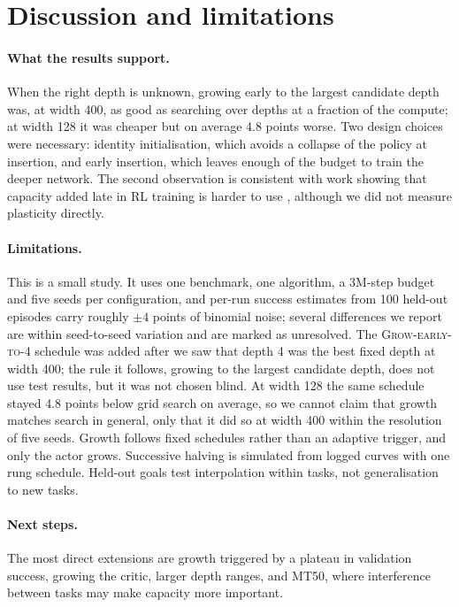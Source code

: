 \documentclass{article}
\newcommand{\growF}{\textsc{Grow-early-to-4}}
\begin{document}
\FloatBarrier
\section{Discussion and limitations}

\paragraph{What the results support.}
When the right depth is unknown, growing early to the largest candidate depth was, at width 400, as good as searching over depths at a fraction of the compute; at width 128 it was cheaper but on average 4.8 points worse.
Two design choices were necessary: identity initialisation, which avoids a collapse of the policy at insertion, and early insertion, which leaves enough of the budget to train the deeper network.
The second observation is consistent with work showing that capacity added late in RL training is harder to use \citep{nikishin2022primacy,lyle2023plasticity}, although we did not measure plasticity directly.

\paragraph{Limitations.}
This is a small study.
It uses one benchmark, one algorithm, a 3M-step budget and five seeds per configuration, and per-run success estimates from 100 held-out episodes carry roughly $\pm 4$ points of binomial noise; several differences we report are within seed-to-seed variation and are marked as unresolved.
The \growF{} schedule was added after we saw that depth 4 was the best fixed depth at width 400; the rule it follows, growing to the largest candidate depth, does not use test results, but it was not chosen blind.
At width 128 the same schedule stayed 4.8 points below grid search on average, so we cannot claim that growth matches search in general, only that it did so at width 400 within the resolution of five seeds.
Growth follows fixed schedules rather than an adaptive trigger, and only the actor grows.
Successive halving is simulated from logged curves with one rung schedule.
Held-out goals test interpolation within tasks, not generalisation to new tasks.

\paragraph{Next steps.}
The most direct extensions are growth triggered by a plateau in validation success, growing the critic, larger depth ranges, and MT50, where interference between tasks may make capacity more important.
\end{document}

